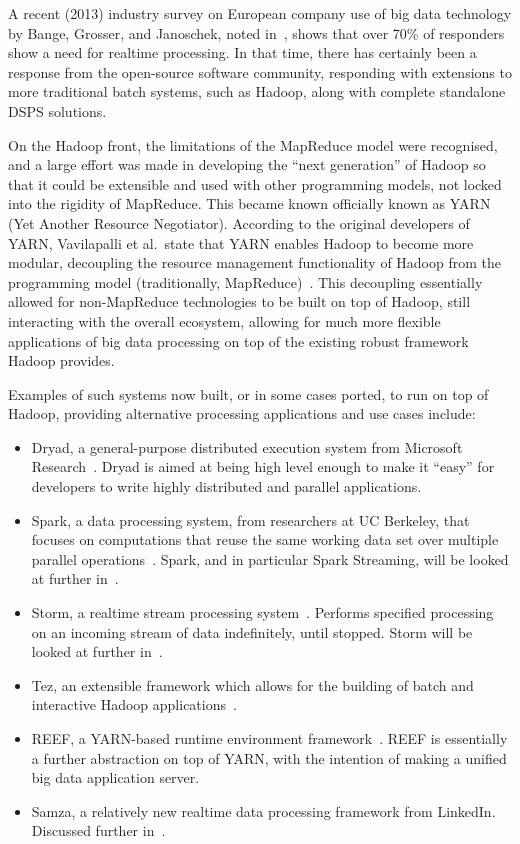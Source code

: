 \documentclass[a4paper,11pt]{article}
\begin{document}
A recent (2013) industry survey on European company use of big data technology by Bange, Grosser, and Janoschek, noted
in~\cite{industry_bd_survey}, shows that over 70\% of responders show a need for realtime processing. In that time,
there has certainly been a response from the open-source software community, responding with extensions to more
traditional batch systems, such as Hadoop, along with complete standalone DSPS solutions.

On the Hadoop front, the limitations of the MapReduce model were recognised, and a large effort was made in developing
the ``next generation'' of Hadoop so that it could be extensible and used with other programming models, not locked into
the rigidity of MapReduce. This became known officially known as YARN (Yet Another Resource Negotiator). According to
the original developers of YARN, Vavilapalli et al.\ state that YARN enables Hadoop to become more modular, decoupling
the resource management functionality of Hadoop from the programming model (traditionally, MapReduce)~\cite{vavilapalli2013apache}.
This decoupling essentially allowed for non-MapReduce technologies to be built on top of Hadoop, still interacting with the
overall ecosystem, allowing for much more flexible applications of big data processing on top of the existing robust
framework Hadoop provides.

Examples of such systems now built, or in some cases ported, to run on top of Hadoop, providing alternative processing
applications and use cases include:

\begin{itemize}
  \item Dryad, a general-purpose distributed execution system from Microsoft Research~\cite{isard2007dryad}. Dryad is
  aimed at being high level enough to make it ``easy'' for developers to write highly distributed and parallel applications.
  \item Spark, a data processing system, from researchers at UC Berkeley, that focuses on computations that reuse the same working data set over multiple
  parallel operations~\cite{zaharia2010spark}. Spark, and in particular Spark Streaming, will be looked at further in~.
  \item Storm, a realtime stream processing system~\cite[p.\ 244]{murthy2013apache}. Performs specified processing on an
  incoming stream of data indefinitely, until stopped. Storm will be looked at further in~.
  \item Tez, an extensible framework which allows for the building of batch and interactive Hadoop applications~\cite{web_tez}.
  \item REEF, a YARN-based runtime environment framework~\cite{chun2013reef}. REEF is essentially a further abstraction
  on top of YARN, with the intention of making a unified big data application server.
  \item Samza, a relatively new realtime data processing framework from LinkedIn. Discussed further in~.
\end{itemize}
\end{document}
